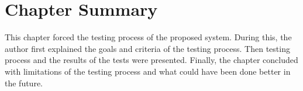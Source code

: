 \section{Chapter Summary}

This chapter forced the testing process of the proposed system. During this, the author first explained the goals and criteria of the testing process. Then testing process and the results of the tests were presented. Finally, the chapter concluded with limitations of the testing process and what could have been done better in the future.